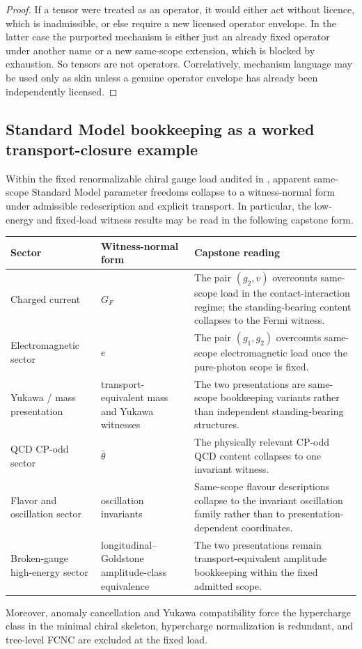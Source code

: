 \begin{proof}
If a tensor were treated as an operator, it would either act without licence, which is inadmissible, or else require a new licensed operator envelope. In the latter case the purported mechanism is either just an already fixed operator under another name or a new same-scope extension, which is blocked by exhaustion. So tensors are not operators. Correlatively, mechanism language may be used only as skin unless a genuine operator envelope has already been independently licensed.
\end{proof}

\subsection{Standard Model bookkeeping as a worked transport-closure example}

\begin{proposition}
\label{prop:sm-witness-collapse}
Within the fixed renormalizable chiral gauge load audited in \structuradoc{}, apparent same-scope Standard Model parameter freedoms collapse to a witness-normal form under admissible redescription and explicit transport. In particular, the low-energy and fixed-load witness results may be read in the following capstone form.
\begin{center}
\renewcommand{\arraystretch}{1.18}
\begin{tabularx}{0.96\textwidth}{P{0.29\textwidth}P{0.28\textwidth}Y}
\toprule
\textbf{Sector} & \textbf{Witness-normal form} & \textbf{Capstone reading} \\
\midrule
Charged current & $G_F$ & The pair $(g_2,v)$ overcounts same-scope load in the contact-interaction regime; the standing-bearing content collapses to the Fermi witness. \\
Electromagnetic sector & $e$ & The pair $(g_1,g_2)$ overcounts same-scope electromagnetic load once the pure-photon scope is fixed. \\
Yukawa / mass presentation & transport-equivalent mass and Yukawa witnesses & The two presentations are same-scope bookkeeping variants rather than independent standing-bearing structures. \\
QCD CP-odd sector & $\bar\theta$ & The physically relevant CP-odd QCD content collapses to one invariant witness. \\
Flavor and oscillation sector & oscillation invariants & Same-scope flavour descriptions collapse to the invariant oscillation family rather than to presentation-dependent coordinates. \\
Broken-gauge high-energy sector & longitudinal--Goldstone amplitude-class equivalence & The two presentations remain transport-equivalent amplitude bookkeeping within the fixed admitted scope. \\
\bottomrule
\end{tabularx}
\end{center}
Moreover, anomaly cancellation and Yukawa compatibility force the hypercharge class in the minimal chiral skeleton, hypercharge normalization is redundant, and tree-level FCNC are excluded at the fixed load.
\end{proposition}

